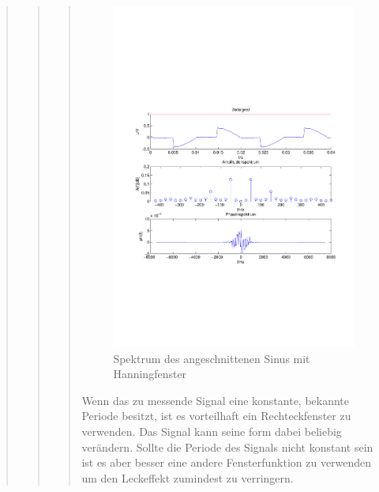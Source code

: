 \begin{quote}
\begin{quote}
\begin{quote}
            \begin{figure}[H]
            \centering
                \includegraphics[scale=0.7, trim = 1.5cm 7cm 1.5cm 8.5cm,
                clip]{./Bilder/Phasenanschnittsmessungmitrechteckfenster.pdf}
                    \caption{Spektrum des angeschnittenen Sinus mit Hanningfenster}
            \end{figure}
            
            Wenn das zu messende Signal eine konstante, bekannte Periode besitzt, ist es vorteilhaft ein Rechteckfenster
            zu verwenden. Das Signal kann seine form dabei beliebig verändern. Sollte die Periode des Signals nicht
            konstant sein ist es aber besser eine andere Fensterfunktion zu verwenden um den Leckeffekt zumindest zu
            verringern.

         \end{quote} %
        

\end{quote}
\end{quote}
